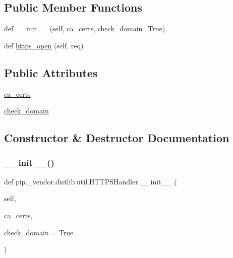 \subsection*{Public Member Functions}
\begin{DoxyCompactItemize}
\item 
def \hyperlink{classpip_1_1__vendor_1_1distlib_1_1util_1_1HTTPSHandler_ab18db196a56460f8cf340f88dbc7e355}{\+\_\+\+\_\+init\+\_\+\+\_\+} (self, \hyperlink{classpip_1_1__vendor_1_1distlib_1_1util_1_1HTTPSHandler_aaf8e2259c9f0ee2e8c654a9b476719bc}{ca\+\_\+certs}, \hyperlink{classpip_1_1__vendor_1_1distlib_1_1util_1_1HTTPSHandler_a2e3d5dc107135f64ae0c232e34a7593b}{check\+\_\+domain}=True)
\item 
def \hyperlink{classpip_1_1__vendor_1_1distlib_1_1util_1_1HTTPSHandler_a68d8f087cf2892f22a1705723fa52dd9}{https\+\_\+open} (self, req)
\end{DoxyCompactItemize}
\subsection*{Public Attributes}
\begin{DoxyCompactItemize}
\item 
\hyperlink{classpip_1_1__vendor_1_1distlib_1_1util_1_1HTTPSHandler_aaf8e2259c9f0ee2e8c654a9b476719bc}{ca\+\_\+certs}
\item 
\hyperlink{classpip_1_1__vendor_1_1distlib_1_1util_1_1HTTPSHandler_a2e3d5dc107135f64ae0c232e34a7593b}{check\+\_\+domain}
\end{DoxyCompactItemize}


\subsection{Constructor \& Destructor Documentation}
\mbox{\label{classpip_1_1__vendor_1_1distlib_1_1util_1_1HTTPSHandler_ab18db196a56460f8cf340f88dbc7e355}} 
\subsubsection{\texorpdfstring{\+\_\+\+\_\+init\+\_\+\+\_\+()}{\_\_init\_\_()}}
{\footnotesize\ttfamily def pip.\+\_\+vendor.\+distlib.\+util.\+H\+T\+T\+P\+S\+Handler.\+\_\+\+\_\+init\+\_\+\+\_\+ (\begin{DoxyParamCaption}\item[{}]{self,  }\item[{}]{ca\+\_\+certs,  }\item[{}]{check\+\_\+domain = {\ttfamily True} }\end{DoxyParamCaption})}



